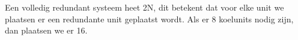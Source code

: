 Een volledig redundant systeem heet 2N, dit betekent dat voor elke unit we plaatsen er een redundante unit geplaatst wordt. Als er 8 koelunits nodig zijn, dan plaatsen we er 16.

